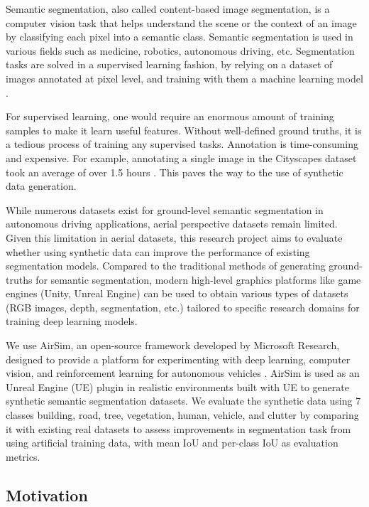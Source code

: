 \documentclass[../report.tex]{subfiles}
\begin{document}
    Semantic segmentation, also called content-based image segmentation, is a computer vision task that helps understand the scene or the context of an image by classifying each pixel into a semantic class. Semantic segmentation is used in various fields such as medicine, robotics, autonomous driving, etc. Segmentation tasks are solved in a supervised learning fashion, by relying on a dataset of images annotated at pixel level, and training with them a machine learning model \cite{csurka2022semantic}. 
    
    For supervised learning, one would require an enormous amount of training samples to make it learn useful features. Without well-defined ground truths, it is a tedious process of training any supervised tasks. Annotation is time-consuming and expensive. For example, annotating a single image in the Cityscapes dataset took an average of over 1.5 hours \cite{cordts2016cityscapes}. This paves the way to the use of synthetic data generation. 
    
    While numerous datasets exist for ground-level semantic segmentation in autonomous driving applications, aerial perspective datasets remain limited.
    Given this limitation in aerial datasets, this research project aims to evaluate whether using synthetic data can improve the performance of existing segmentation models. Compared to the traditional methods of generating ground-truths for semantic segmentation, modern high-level graphics platforms like game engines (Unity, Unreal Engine) can be used to obtain various types of datasets (RGB images, depth, segmentation, etc.) tailored to specific research domains for training deep learning models.

    We use AirSim, an open-source framework developed by Microsoft Research, designed to provide a platform for experimenting with deep learning, computer vision, and reinforcement learning for autonomous vehicles \cite{shah2018airsim}.
    AirSim is used as an Unreal Engine (UE) plugin in realistic environments built with UE to generate synthetic semantic segmentation datasets. 
    We evaluate the synthetic data using 7 classes building, road, tree, vegetation, human, vehicle, and clutter by comparing it with existing real datasets to assess improvements in segmentation task from using artificial training data, with mean IoU and per-class IoU as evaluation metrics.
    

    \subsection{Motivation}
    \label{sec:introduction:motivation}
\end{document}
